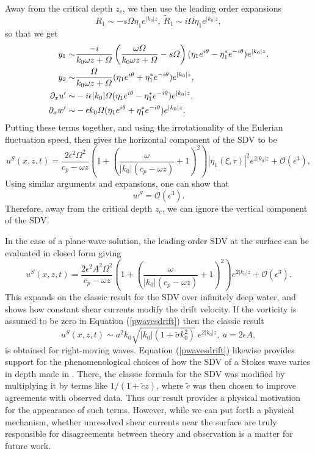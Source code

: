 \documentclass{JFM_Style/jfm}
\newcommand{\pd}{\partial}
\begin{document}
Away from the critical depth $z_{c}$, we then use the leading order expansions
\[
R_{1} \sim -s\Omega\eta_{1}e^{|k_{0}|z}, ~ \tilde{R}_{1} \sim i\Omega\eta_{1}e^{|k_{0}|z}, 
\]
so that we get 
\begin{align*}
y_{1} \sim & \frac{-i}{k_{0}\omega z + \Omega}\left(\frac{\omega\Omega}{k_{0}\omega z + \Omega} - s\Omega \right)(\eta_{1}e^{i\theta} - \eta_{1}^{\ast}e^{-i\theta})e^{|k_{0}|z},\\ 
y_{2} \sim & \frac{\Omega}{k_{0}\omega z + \Omega}(\eta_{1}e^{i\theta} + \eta^{\ast}_{1}e^{-i\theta})e^{|k_{0}|z},\\
\p_{x}u' \sim & -i\epsilon|k_{0}|\Omega(\eta_{1}e^{i\theta}-\eta_{1}^{\ast}e^{-i\theta})e^{|k_{0}|z},\\
\pd_{x}w' \sim & - \epsilon k_{0}\Omega(\eta_{1}e^{i\theta}+\eta_{1}^{\ast}e^{-i\theta})e^{|k_{0}|z}.
\end{align*}
Putting these terms together, and using the irrotationality of the Eulerian fluctuation speed, then gives the horizontal component of the SDV to be 
\begin{equation}
u^{S}(x,z,t) = \frac{2\epsilon^{2}\Omega^{2}}{c_{p} - \omega z }\left(1 + \left(\frac{\omega}{|k_{0}|(c_{p} - \omega z )} + 1\right)^{2} \right)|\eta_{1}(\xi,\tau)|^{2}e^{2|k_{0}|z} + \mathcal{O}(\epsilon^{3}), 
\label{sdriftveloc}
\end{equation}
Using similar arguments and expansions, one can show that 
\[
w^{S} = \mathcal{O}(\epsilon^{3}).
\]
Therefore, away from the critical depth $z_{c}$, we can ignore the vertical component of the SDV.  

In the case of a plane-wave solution, the leading-order SDV at the surface can be evaluated in closed form giving  
\begin{equation}
u^{S}(x,z,t) = \frac{2\epsilon^{2}A^{2}\Omega^{2}}{c_{p}-\omega z} \left(1 + \left(\frac{\omega}{|k_{0}|(c_{p} - \omega z )} + 1\right)^{2} \right) e^{2|k_{0}|z} + \mathcal{O}(\epsilon^{3}).
\label{pwavesdrift}
\end{equation}
This expands on the classic result for the SDV over infinitely deep water, and shows how constant shear currents modify the drift velocity.  If the vorticity is assumed to be zero in Equation (\ref{pwavesdrift}) then the classic result
\begin{equation}
u^{S}(x,z,t) \sim a^{2}k_0\sqrt{|k_0|(1+\tilde{\sigma}k_0^2)}~e^{2|k_0|z}, ~ a = 2\epsilon A,
\end{equation}
is obtained for right-moving waves.  Equation (\ref{pwavesdrift}) likewise provides support for the phenomenological choices of how the SDV of a Stokes wave varies in depth made in \cite{breivik}.  There, the classic formula for the SDV was modified by multiplying it by terms like $1/(1+\tilde{c}z)$, where $\tilde{c}$ was then chosen to improve agreements with observed data.  Thus our result provides a physical motivation for the appearance of such terms.  However, while we can put forth a physical mechanism, whether unresolved shear currents near the surface are truly responsible for disagreements between theory and observation is a matter for future work.     
\end{document}
